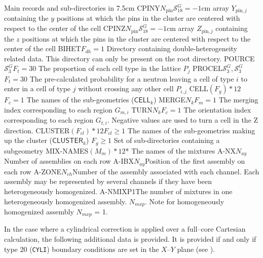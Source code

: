 \begin{DescriptionEnregistrement}{Main records and sub-directories in }{7.5cm}
\OptRealEnr
  {CPINY}{$N_{\text{pin}}$}{$\mathcal{S}^{G}_{18}=-1$}{cm}
  {array $Y_{\text{pin},j}$ containing the $y$ positions at which the pins in the cluster are centered with respect to the center of the cell}
\OptRealEnr
  {CPINZ}{$N_{\text{pin}}$}{$\mathcal{S}^{G}_{18}=-1$}{cm}
  {array $Z_{\text{pin},j}$ containing the $z$ positions at which the pins in the cluster are centered with respect to the center of the cell}
\OptDirEnr
  {BIHET}{$F_{dh}=1$}
  {Directory containing double-heterogeneity related data. This directory can only be present on the root directory.}
\OptRealEnr
  {POURCE}{$\mathcal{S}^{G}_{3}$}{$F_{t}=30$}{}
  {The proportion of each cell type in the lattice $P_{j}$}
\OptRealEnr
  {PROCEL}{$\mathcal{S}^{G}_{3},\mathcal{S}^{G}_{3}$}{$F_{t}=30$}{}
  {The pre-calculated probability for a neutron leaving a cell of type $i$ to enter in a
  cell of type $j$ without crossing any other cell $P_{i,j}$}
\OptCharEnr
  {CELL}{$(F_{g})*12$}{$F_{c}=1$}
  {The names of the sub-geometries ($\mathsf{CELL}_{k}$)}
\OptIntEnr
  {MERGE}{$N_{k}$}{$F_{m}=1$}
  {The merging index corresponding to each region $G_{m,i}$}
\OptIntEnr
  {TURN}{$N_{k}$}{$F_{c}=1$}
  {The orientation index corresponding to each region $G_{t,i}$. Negative values are used to turn a cell in the Z direction.}
\OptCharEnr
  {CLUSTER}{$(F_{cl})*12$}{$F_{cl}\ge 1$}
  {The names of the sub-geometries making up the cluster ($\mathsf{CLUSTER}_{k}$)}
\OptDirVar
  {}{$F_{g}\ge 1$}
  {Set of sub-directories containing a subgeometry}
\OptCharEnr
  {MIX-NAMES}{$(M_{m})*12$}{*}
  {The names of the mixtures}
\IntEnr
  {A-NX}{$N_{ay}$}{Number of assemblies on each row}
\IntEnr
  {A-IBX}{$N_{ay}$}{Position of the first assembly on each row}
\IntEnr
  {A-ZONE}{$N_{ch}$}{Number of the assembly associated with each channel. Each assembly may be represented by several channels if they have been heterogeneously homogenized.}
\IntEnr
  {A-NMIXP}{1}{The number of mixtures in one heterogeneously homogenized assembly. $N_{mxp}$. Note for homogeneously  homogenized assembly  $N_{mxp}$ = 1.}
\end{DescriptionEnregistrement}

In the case where a cylindrical correction is applied over a full--core Cartesian
calculation, the following additional data is provided. It is provided if and only if type 20
({\tt CYLI}) boundary conditions are set in the $X$--$Y$ plane (see ).

